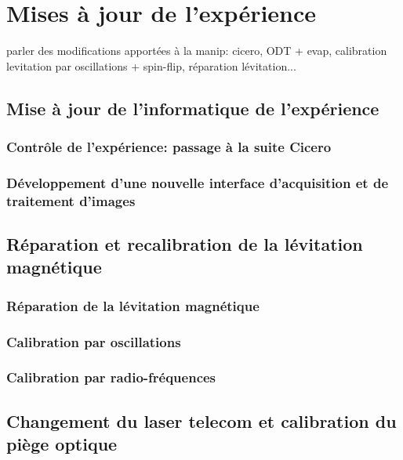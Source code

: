 \chapter{Mises à jour de l'expérience}
\label{ch:new_exp}


parler des modifications apportées à la manip: cicero, ODT + evap, calibration levitation par oscillations + spin-flip, réparation lévitation...

\section{Mise à jour de l'informatique de l'expérience}
\subsection{Contrôle de l'expérience: passage à la suite Cicero}
\label{sc:cicero}
\subsection{Développement d'une nouvelle interface d'acquisition et de traitement d'images}

\section{Réparation et recalibration de la lévitation magnétique}
\subsection{Réparation de la lévitation magnétique}
\label{sc:levitation}
\subsection{Calibration par oscillations}
\subsection{Calibration par radio-fréquences}

\section{Changement du laser telecom et calibration du piège optique}
